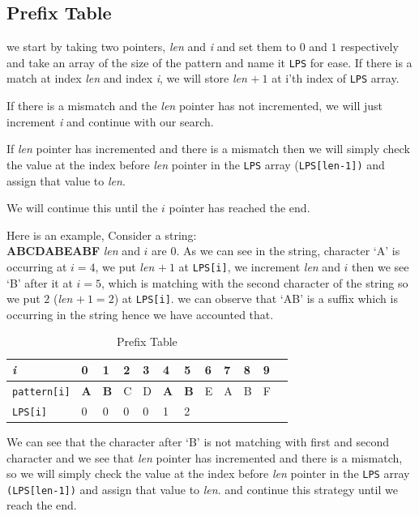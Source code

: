 \documentclass[a4paper, 12pt]{report}
\begin{document}
    \subsection{Prefix Table}
    
    we start by taking two pointers, \textit{len} and \textit{i} and set them to $0$ and $1$ respectively and take an array of the size of the pattern and name it \texttt{LPS} for ease. If there is a match at index \textit{len} and index \textit{i}, we will store \textit{len} $+\ 1$ at i'th index of \texttt{LPS} array.
    
    If there is a mismatch and the \textit{len} pointer has not incremented, we will just increment \textit{i} and continue with our search. 
    
    If \textit{len} pointer has incremented and there is a mismatch then we will simply check the value at the index before \textit{len} pointer in the \texttt{LPS} array (\texttt{LPS[len-1])} and assign that value to \textit{len}.

    We will continue this until the $i$ pointer has reached the end.
    
    Here is an example, Consider a string: \\
    \textbf{ABCDABEABF}
    \textit{len} and $i$ are 0. 
    As we can see in the string, character `A' is occurring at $i = 4$, we put \textit{len} $+\ 1$ at \texttt{LPS[i]}, we increment \textit{len} and $i$ then we see `B' after it at $i = 5$, which is matching with the second character of the string so we put $2$ (\textit{len} $+\ 1 = 2$) at \texttt{LPS[i]}. we can observe that `AB' is a suffix which is occurring in the string hence we have accounted that.
    
        \begin{table}[h]
        \centering
        \begin{tabular}{l|l|l|l|l|l|l|l|l|l|l|l}
        \cline{2-11}
        \textit{i}    & 0 & 1 & 2 & 3 & 4 & 5 & 6 & 7 & 8 & 9 \\ \hline
        \texttt{pattern[i]} & \textbf{A} & \textbf{B} & C & D & \textbf{A} & \textbf{B} & E & A & B & F \\ \hline
        \texttt{LPS[i]}     & 0  & 0  &  0 &  0 & 1 & 2 &   &   &   & \\ \hline
        \end{tabular}
        \caption{Prefix Table}
        \label{tab:Prefixtable2}
        \end{table}  
        
    We can see that the character after `B' is not matching with first and second character and we see that \textit{len} pointer has incremented and there is a mismatch, so we will simply check the value at the index before \textit{len} pointer in the \texttt{LPS} array \texttt{(LPS[len-1])} and assign that value to \textit{len}. and continue this strategy until we reach the end.
    
\end{document}
